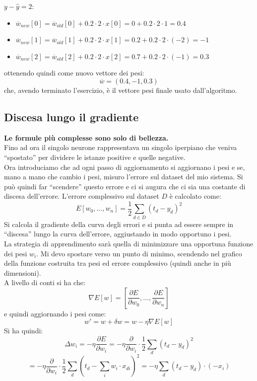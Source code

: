 \documentclass[a4paper,12pt, oneside]{book}
\begin{document}
\begin{esercizio}
  $y-\hat{y}=2$:
  \begin{itemize}
    \item
    $\overline{w}_{new}[0]=\overline{w}_{old}[0]+0.2\cdot 2\cdot
    x[0]=0+0.2\cdot 2\cdot 1=0.4$ 
    \item
    $\overline{w}_{new}[1]=\overline{w}_{old}[1]+0.2\cdot 2\cdot
    x[1]=0.2+0.2\cdot 2\cdot (-2)=-1$ 
    \item
    $\overline{w}_{new}[2]=\overline{w}_{old}[2]+0.2\cdot 2\cdot x[2]=0.7+0.2
    \cdot 2\cdot(-1)=0.3$    
  \end{itemize}
  ottenendo quindi come nuovo vettore dei pesi:
  \[\overline{w}=(0.4, -1, 0.3)\]
  che, avendo terminato l'esercizio, è il vettore pesi finale usato
  dall'algoritmo. 
\end{esercizio}
\subsection{Discesa lungo il gradiente}
\textbf{Le formule più complesse sono solo di bellezza.}\\
\noindent
Fino ad ora il singolo neurone rappresentava un singolo iperpiano che veniva
``spostato'' per dividere le istanze positive e quelle negative.\\
Ora introduciamo che ad ogni passo di aggiornamento si aggiornano i pesi e se,
mano a mano che cambio i pesi, misuro l'errore sul dataset del mio sistema. Si
può quindi far ``scendere'' questo errore e ci si augura che ci sia una costante
di discesa dell'errore. L'errore complessivo sul dataset $D$ è calcolato come:
\[E[w_0,\ldots, w_n]=\frac{1}{2}\sum_{d\in D}(t_d-y_d)^2\]
Si calcola il gradiente della curva degli errori e si punta ad essere sempre in
``discesa'' lungo la curva dell'errore, aggiustando in modo opportuno i pesi.\\
La strategia di apprendimento sarà quella di minimizzare una opportuna
funzione dei pesi $w_i$. Mi devo spostare verso un punto di minimo, scendendo
nel grafico della funzione costruita tra pesi ed errore complessivo (quindi
anche in più dimensioni).\\
A livello di conti si ha che:
\[\nabla E[w]=\left[\frac{\partial E}{\partial w_0},\ldots,\frac{\partial
      E}{\partial w_n}\right]\]
e quindi aggiornando i pesi come:
\[w'=w+\delta w= w-\eta\nabla E[w]\]
Si ha quindi:
\[\Delta w_i=-\eta\frac{\partial E}{\partial w_i}=-\eta\frac{\partial}{\partial
    w_i}\cdot \frac{1}{2}\sum_d (t_d-y_d)^2\]
\[=-\eta\frac{\partial}{\partial
    w_i}\cdot \frac{1}{2}\sum_d (t_d-\sum_i w_i\cdot x_{di})^2=
  -\eta\sum_d(t_d-y_d)\cdot(-x_i)\]
\end{document}
